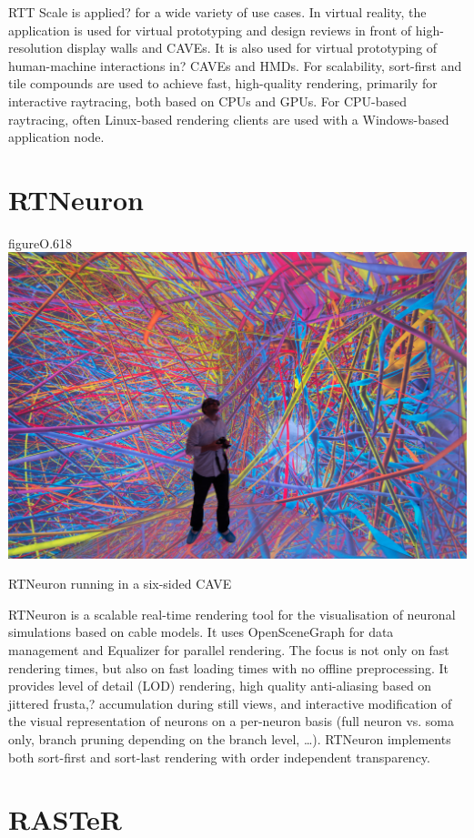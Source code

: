 RTT Scale is applied? for a wide variety of use cases. In virtual reality, the
application is used for virtual prototyping and design reviews in front of
high-resolution display walls and CAVEs. It is also used for virtual prototyping of
human-machine interactions in? CAVEs and HMDs. For scalability, sort-first and
tile compounds are used to achieve fast, high-quality rendering, primarily for
interactive raytracing, both based on CPUs and GPUs. For CPU-based raytracing,
often Linux-based rendering clients are used with a Windows-based application
node.

\section{RTNeuron}\label{sRTNeuron}

\begin{wrapfloat}{figure}{O}{.618\textwidth}
  \includegraphics[width=.618\textwidth]{images/RTNeuron}
  {\caption{\label{fRTNeuron}RTNeuron running in a six-sided CAVE}}
\end{wrapfloat}

RTNeuron \cite{HBBES:13} is a scalable real-time rendering tool for the
visualisation of neuronal simulations based on cable models. It uses
OpenSceneGraph for data management and Equalizer for parallel rendering.
The focus is not only on fast rendering times, but also on fast loading times with no
offline preprocessing. It provides level of detail (LOD) rendering, high quality
anti-aliasing based on jittered frusta,? accumulation during still views, and
interactive modification of the visual representation of neurons on a per-neuron
basis (full neuron vs. soma only, branch pruning depending on the branch level,
\dots). RTNeuron implements both sort-first and sort-last rendering with order
independent transparency.

\section{RASTeR}

